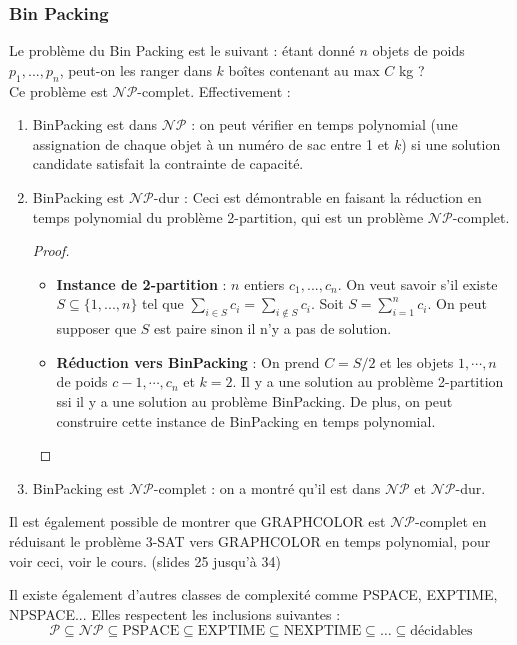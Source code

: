 \subsubsection{Bin Packing}
\label{sub:bin_packing}
Le problème du Bin Packing est le suivant : étant donné $n$ objets de poids $p_1,...,p_n$, peut-on les ranger dans $k$ boîtes
contenant au max $C$ kg ?\\

Ce problème est $\mathcal{NP}$-complet. Effectivement :
\begin{enumerate}
    \item BinPacking est dans $\mathcal{NP}$ : on peut vérifier en temps polynomial (une assignation de chaque objet à un numéro
    de sac entre 1 et $k$) si une solution candidate satisfait la contrainte de capacité.
    \item BinPacking est $\mathcal{NP}$-dur : Ceci est démontrable en faisant la réduction en temps polynomial du problème 
    2-partition, qui est un problème $\mathcal{NP}$-complet.
    \begin{proof}
        \begin{itemize}[label=$\rightarrow$]
            \item \textbf{Instance de 2-partition} : $n$ entiers $c_1,...,c_n$. On veut savoir s'il existe $S\subseteq\{1,...,n\}$
            tel que $\sum_{i\in S}c_i = \sum_{i\notin S}c_i$. Soit $S = \sum_{i=1}^{n}c_i$. On peut supposer que $S$ est paire sinon
            il n'y a pas de solution.
            \item \textbf{Réduction vers BinPacking} : On prend $C = S/2$ et les objets $1,\cdots,n$ de poids $c-1,\cdots,c_n$ et 
            $k=2$. Il y a une solution au problème 2-partition ssi il y a une solution au problème BinPacking. De plus, on peut 
            construire cette instance de BinPacking en temps polynomial. 
        \end{itemize}
    \end{proof}
    \item BinPacking est $\mathcal{NP}$-complet : on a montré qu'il est dans $\mathcal{NP}$ et $\mathcal{NP}$-dur.
\end{enumerate}
Il est également possible de montrer que GRAPHCOLOR est $\mathcal{NP}$-complet en réduisant le problème 3-SAT vers GRAPHCOLOR
en temps polynomial, pour voir ceci, voir le cours. (slides 25 jusqu'à 34)\\
\begin{remark}
    Il existe également d'autres classes de complexité comme PSPACE, EXPTIME, NPSPACE...
    Elles respectent les inclusions suivantes :
    \begin{equation*}
        \mathcal{P}\subseteq\mathcal{NP}\subseteq\text{PSPACE}\subseteq\text{EXPTIME}\subseteq\text{NEXPTIME}\subseteq\dots
        \subseteq \text{décidables}
    \end{equation*}
\end{remark}


